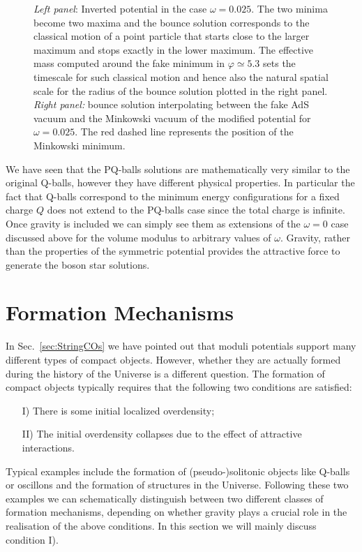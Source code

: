 \documentclass[11pt,a4paper]{article}
\begin{document}
\begin{figure}
\hfill
{}
\caption{\textit{Left panel}: Inverted potential in the case $\omega=0.025$. The two minima become two maxima and the bounce solution corresponds to the classical motion of a point particle that starts close to the larger maximum and stops exactly in the lower maximum. The effective mass computed around the fake minimum in $\varphi \simeq 5.3$ sets the timescale for such classical motion and hence also the natural spatial scale for the radius of the bounce solution plotted in the right panel. \textit{Right panel:} bounce solution interpolating between the fake AdS vacuum and the Minkowski vacuum of the modified potential for $\omega = 0.025$. The red dashed line represents the position of the Minkowski minimum.}
\label{fig:Bounce}
\end{figure}

 
We have seen that the PQ-balls solutions are mathematically very similar to the original Q-balls, however they have different physical properties. In particular the fact that Q-balls correspond to the minimum energy configurations for a fixed charge $Q$ does not extend to the PQ-balls case since the total charge is infinite.  Once gravity is included we can simply see them as extensions  of the $\omega=0$ case discussed above for the volume modulus to arbitrary values of $\omega$. Gravity, rather than the properties of the symmetric potential provides the attractive force to generate the boson star solutions.

\section{Formation Mechanisms}
\label{sec:formationall}

In Sec.~\ref{sec:StringCOs} we have pointed out that moduli potentials support many different types of compact objects. However, whether they are actually formed during the history of the Universe is a different question. The formation of compact objects typically requires that the following two conditions are satisfied:
\begin{itemize}
\item[I)] There is some initial localized overdensity;
\item[II)] The initial overdensity collapses due to the effect of attractive interactions.
\end{itemize}
Typical examples include the formation of (pseudo-)solitonic objects like Q-balls or oscillons and the formation of structures in the Universe. Following these two examples we can schematically distinguish between two different classes of formation mechanisms, depending on whether gravity plays a crucial role in the realisation of the above conditions. In this section we will mainly discuss condition I).\\
\end{document}
